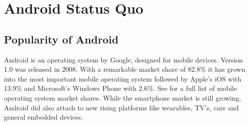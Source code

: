 \chapter{Android Status Quo}\label{chapter:android_status_quo}

\section{Popularity of Android}
Android is an operating system by Google,
designed for mobile devices. Version 1.0 was released
in 2008. With a remarkable market share of 82.8\%
it has grown into the most important mobile operating system
followed by Apple's iOS with 13.9\% and Microsoft's Windows
Phone with 2.6\%. See \parencite{Idc15} for a full list
of mobile operating system market shares. While the smartphone
market is still growing, Android did also attach to new
rising platforms like wearables, TV's, cars and general
embedded devices.



